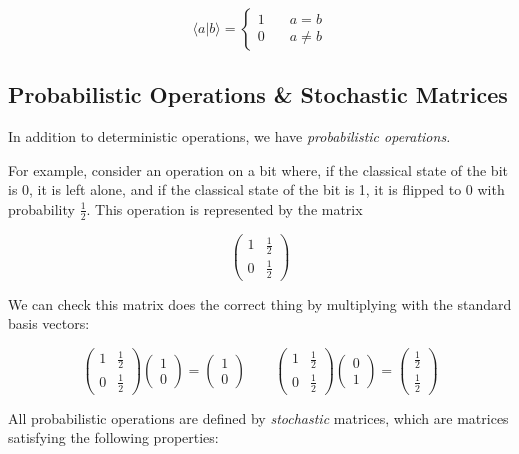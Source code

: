 \documentclass[svgnames]{article}     %
\begin{document}
 \[
\langle a | b \rangle = \begin{cases}
  1 \quad &a=b \\ 0 \quad &a\neq b
\end{cases} \] \vspace{5px}


\subsection{Probabilistic Operations \& Stochastic Matrices}

In addition to deterministic operations, we have \textit{probabilistic
operations.}

For example, consider an operation on a bit where, if the classical state of
the bit is 0, it is left alone, and if the classical state of the bit is 1, it
is flipped to 0 with probability $\frac{1}{2}$. This operation is represented
by the matrix

\[
\begin{pmatrix}
  1 & \frac{1}{2} \\[2px] 
  0 & \frac{1}{2}
\end{pmatrix}
\] \vspace{5px}

We can check this matrix does the correct thing by multiplying with the
standard basis vectors: 

\[
\begin{pmatrix}
  1 & \frac{1}{2} \\[2px]
  0 & \frac{1}{2} 
\end{pmatrix} 
\begin{pmatrix}
  1 \\[2px] 0
\end{pmatrix} = \begin{pmatrix}
1 \\[2px] 0 
\end{pmatrix} \qquad
\begin{pmatrix}
  1 & \frac{1}{2} \\[2px]
  0 & \frac{1}{2} 
\end{pmatrix} 
\begin{pmatrix}
  0 \\[2px] 1
\end{pmatrix} = \begin{pmatrix}
\frac{1}{2} \\[2px] \frac{1}{2} 
\end{pmatrix} 
\] \vspace{5px}

All probabilistic operations are defined by \textit{stochastic} matrices, which
are matrices satisfying the following properties: 
\end{document}
